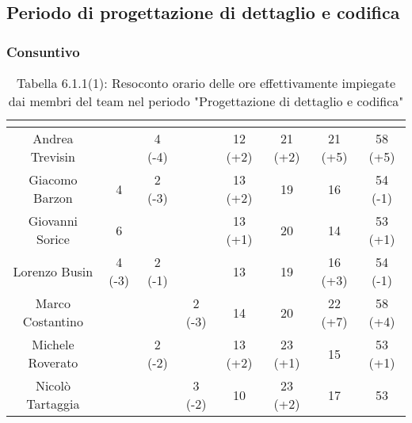 \subsection{Periodo di progettazione di dettaglio e codifica}
\subsubsection{Consuntivo}
\renewcommand{\arraystretch}{1.5}
\begin{table}[H]
\begin{center}
\begin{tabular}{|c|c|c|c|c|c|c|c|}
\hline
\rowcolor{title_row}
\textbf{\color{title_text}{Nome}} & \textbf{\color{title_text}{Resp.}} & \textbf{\color{title_text}{Ammi.}} & \textbf{\color{title_text}{Analist.}} & \textbf{\color{title_text}{Progett.}} & \textbf{\color{title_text}{Program.}} & \textbf{\color{title_text}{Verific.}} & \textbf{\color{title_text}{Totale}} \\ \hline
Andrea Trevisin  & & 4 (-4) & & 12 (+2) & 21 (+2) & 21 (+5) & 58 (+5) \\ \hline
Giacomo Barzon   & 4 & 2 (-3) & & 13 (+2) & 19 & 16 & 54 (-1)  \\ \hline
Giovanni Sorice  & 6 & & & 13 (+1) & 20 & 14 & 53 (+1) \\ \hline
Lorenzo Busin    & 4 (-3) & 2 (-1) & & 13 & 19 & 16 (+3) & 54 (-1) \\ \hline
Marco Costantino & & & 2 (-3) & 14 & 20 & 22 (+7) & 58 (+4) \\ \hline     
Michele Roverato & & 2 (-2) & & 13 (+2) & 23 (+1) & 15 & 53 (+1) \\ \hline    
Nicolò Tartaggia & & & 3 (-2) & 10 & 23 (+2) & 17 & 53 \\ \hline
\end{tabular}
\caption{Tabella 6.1.1(1): Resoconto orario delle ore effettivamente impiegate dai membri del team nel periodo "Progettazione di dettaglio e codifica"\label{}}
\end{center}
\end{table}
\renewcommand{\arraystretch}{1}

